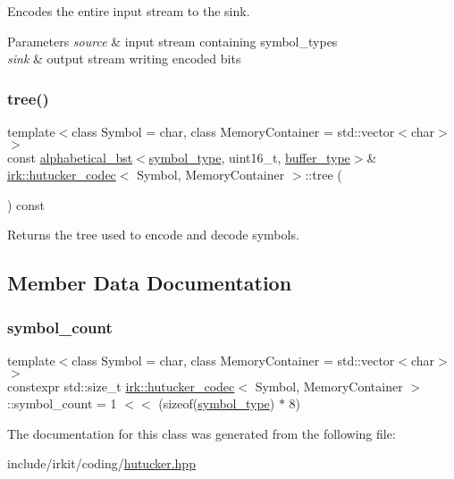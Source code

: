 Encodes the entire input stream to the sink. 


\begin{DoxyParams}{Parameters}
{\em source} & input stream containing {\ttfamily symbol\+\_\+type}s \\
\hline
{\em sink} & output stream writing encoded bits \\
\hline
\end{DoxyParams}
\mbox{\label{classirk_1_1hutucker__codec_a68886f66b539effd689bd54ccf591db1}} 
\subsubsection{\texorpdfstring{tree()}{tree()}}
{\footnotesize\ttfamily template$<$class Symbol  = char, class Memory\+Container  = std\+::vector$<$char$>$$>$ \\
const \mbox{\hyperlink{classirk_1_1alphabetical__bst}{alphabetical\+\_\+bst}}$<$\mbox{\hyperlink{classirk_1_1hutucker__codec_af23dee5959ae2a69eea0ab324cf6ecb6}{symbol\+\_\+type}}, uint16\+\_\+t, \mbox{\hyperlink{classirk_1_1hutucker__codec_a995378c8c253dae9867a4b1762eeaf95}{buffer\+\_\+type}}$>$\& \mbox{\hyperlink{classirk_1_1hutucker__codec}{irk\+::hutucker\+\_\+codec}}$<$ Symbol, Memory\+Container $>$\+::tree (\begin{DoxyParamCaption}{ }\end{DoxyParamCaption}) const\hspace{0.3cm}{\ttfamily [inline]}}



Returns the tree used to encode and decode symbols. 



\subsection{Member Data Documentation}
\mbox{\label{classirk_1_1hutucker__codec_a4b583dcfd72280bb0178cd8cf2845e34}} 
\subsubsection{\texorpdfstring{symbol\+\_\+count}{symbol\_count}}
{\footnotesize\ttfamily template$<$class Symbol  = char, class Memory\+Container  = std\+::vector$<$char$>$$>$ \\
constexpr std\+::size\+\_\+t \mbox{\hyperlink{classirk_1_1hutucker__codec}{irk\+::hutucker\+\_\+codec}}$<$ Symbol, Memory\+Container $>$\+::symbol\+\_\+count = 1 $<$$<$ (sizeof(\mbox{\hyperlink{classirk_1_1hutucker__codec_af23dee5959ae2a69eea0ab324cf6ecb6}{symbol\+\_\+type}}) $\ast$ 8)\hspace{0.3cm}{\ttfamily [static]}}



The documentation for this class was generated from the following file\+:\begin{DoxyCompactItemize}
\item 
include/irkit/coding/\mbox{\hyperlink{hutucker_8hpp}{hutucker.\+hpp}}\end{DoxyCompactItemize}

